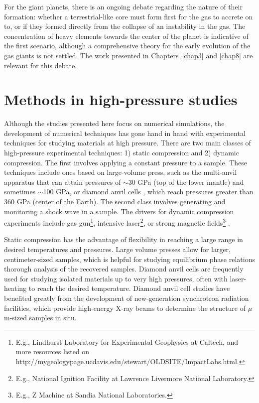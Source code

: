 For the giant planets, there is an ongoing debate regarding the nature of their 
formation: whether a terrestrial-like core must form first for the gas to accrete 
on to, or if they formed directly from the collapse of an instability in the gas. 
The concentration of heavy elements towards the center of the planet is 
indicative of the first scenario, although a comprehensive theory for the 
early evolution of the gas giants is not settled. The work presented in 
Chapters~\ref{chap3} and \ref{chap8} are relevant for this debate.

\section{Methods in high-pressure studies}

Although the studies presented here focus on numerical simulations, the
development of numerical techniques has gone hand in hand with experimental
techniques  for studying materials at high pressure.  There are two main
classes of high-pressure experimental techniques: 1) static compression and 2)
dynamic compression. The first involves applying a constant pressure to a
sample. These techniques include ones based on large-volume press, such as the
multi-anvil apparatus \cite{Ito2007} that can attain pressures of $\sim$30 GPa
(top of the lower mantle) and sometimes $\sim$100 GPa, or diamond anvil cells
\cite{Mao2007}, which reach pressures greater than 360 GPa (center of the
Earth). The second class involves generating and monitoring a shock wave in a
sample. The drivers for dynamic compression experiments include gas
gun\footnote{E.g., Lindhurst Laboratory for Experimental Geophysics at Caltech,
    and more resources listed on
http://mygeologypage.ucdavis.edu/stewart/OLDSITE/ImpactLabs.html.}, intensive
laser\footnote{E.g., National Ignition Facility at Lawrence Livermore National
Laboratory.}, or strong magnetic fields\footnote{E.g., Z Machine at  Sandia
National Laboratories.} \cite{Asimow2015}.

Static compression has the advantage of flexibility in reaching a large range in
desired temperatures and pressures. Large volume presses allow for larger,
centimeter-sized samples, which is helpful for studying equilibrium phase
relations thorough analysis of the recovered samples. Diamond anvil cells are
frequently used for studying isolated materials up to very high pressures,
often with laser-heating to reach the desired temperature. Diamond anvil cell
studies  have benefited greatly from the development of new-generation
synchrotron radiation facilities, which provide high-energy X-ray beams to
determine the structure of $\mu$m-sized samples in situ.


